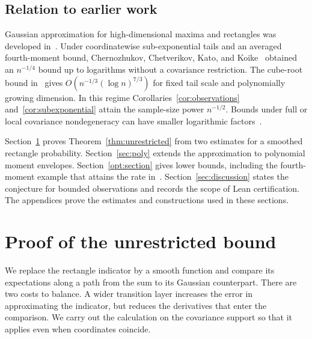 \documentclass[11pt,letterpaper]{article}
\theoremstyle{remark}
\begin{document}
\subsection{Relation to earlier work}
Gaussian approximation for high-dimensional maxima and rectangles was
developed in~\cite{CCK2013,CCK2017}. Under coordinatewise sub-exponential
tails and an averaged fourth-moment bound, Chernozhukov, Chetverikov,
Kato, and Koike~\cite[Theorem~2.1]{CCKK2022} obtained an \(n^{-1/4}\) bound up to logarithms without a covariance
restriction. The cube-root bound in~\cite[Theorem~1]{GaoZhang} gives
\(O(n^{-1/3}(\log n)^{7/3})\) for fixed tail scale and polynomially
growing dimension. In this regime Corollaries~\ref{cor:observations}
and~\ref{cor:subexponential} attain the sample-size power \(n^{-1/2}\).
Bounds under full or local covariance nondegeneracy can have smaller
logarithmic factors~\cite{CCK,AL,FKLZ,Local}.

Section~\ref{sec:smoothing} proves Theorem~\ref{thm:unrestricted} from
two estimates for a smoothed rectangle probability.
Section~\ref{sec:poly} extends the approximation to polynomial moment
envelopes. Section~\ref{opt:section} gives lower bounds, including the
fourth-moment example that attains the rate in~\cite[Theorem~2.5]{CCKK2022}.
Section~\ref{sec:discussion} states the conjecture for bounded observations
and records the scope of Lean certification. The appendices prove the estimates and constructions used in these sections.

\section{Proof of the unrestricted bound}\label{sec:smoothing}
We replace the rectangle indicator by a smooth function and compare its
expectations along a path from the sum to its Gaussian counterpart.
There are two costs to balance. A wider transition layer increases the
error in approximating the indicator, but reduces the derivatives that
enter the comparison. We carry out the calculation on the covariance
support so that it applies even when coordinates coincide.
\end{document}
